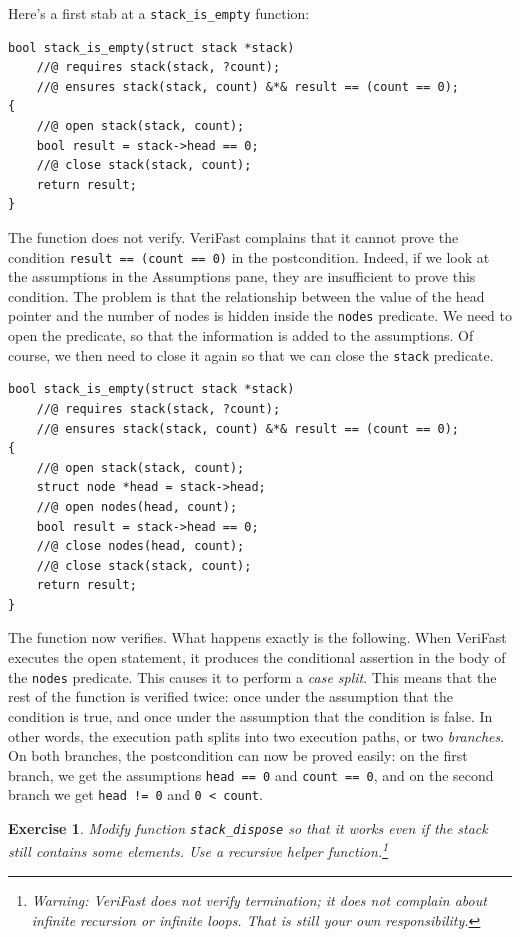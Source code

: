 \documentclass{article}
\newtheorem{exercise}{Exercise}
\begin{document}
Here's a first stab at a \lstinline!stack_is_empty! function:
\begin{lstlisting}
bool stack_is_empty(struct stack *stack)
    //@ requires stack(stack, ?count);
    //@ ensures stack(stack, count) &*& result == (count == 0);
{
    //@ open stack(stack, count);
    bool result = stack->head == 0;
    //@ close stack(stack, count);
    return result;
}
\end{lstlisting}
The function does not verify. VeriFast complains that it cannot
prove the condition \lstinline!result == (count == 0)! in the
postcondition. Indeed, if we look at the assumptions in the
Assumptions pane, they are insufficient to prove this
condition. The problem is that the relationship between the
value of the head pointer and the number of nodes is hidden
inside the \lstinline!nodes! predicate. We need to open the
predicate, so that the information is added to the assumptions.
Of course, we then need to close it again so that we can close
the \lstinline!stack! predicate.
\begin{lstlisting}
bool stack_is_empty(struct stack *stack)
    //@ requires stack(stack, ?count);
    //@ ensures stack(stack, count) &*& result == (count == 0);
{
    //@ open stack(stack, count);
    struct node *head = stack->head;
    //@ open nodes(head, count);
    bool result = stack->head == 0;
    //@ close nodes(head, count);
    //@ close stack(stack, count);
    return result;
}
\end{lstlisting}
The function now verifies. What happens exactly is the
following. When VeriFast executes the open statement, it
produces the conditional assertion in the body of the
\lstinline!nodes! predicate. This causes it to perform a
\emph{case split}. This means that the rest of the function is
verified twice: once under the assumption that the condition is
true, and once under the assumption that the condition is
false. In other words, the execution path splits into two
execution paths, or two \emph{branches}. On both branches, the
postcondition can now be proved easily: on the first branch, we
get the assumptions \lstinline!head == 0! and %
\lstinline!count == 0!, and on the second branch we get
\lstinline$head != 0$ and \lstinline$0 < count$.

\begin{exercise}\label{exercise:dispose}
Modify function \lstinline!stack_dispose! so that it works even
if the stack still contains some elements. Use a recursive
helper function.\footnote{Warning: VeriFast does not verify
termination; it does not complain about infinite recursion or
infinite loops. That is still your own responsibility.}
\end{exercise}
\end{document}
